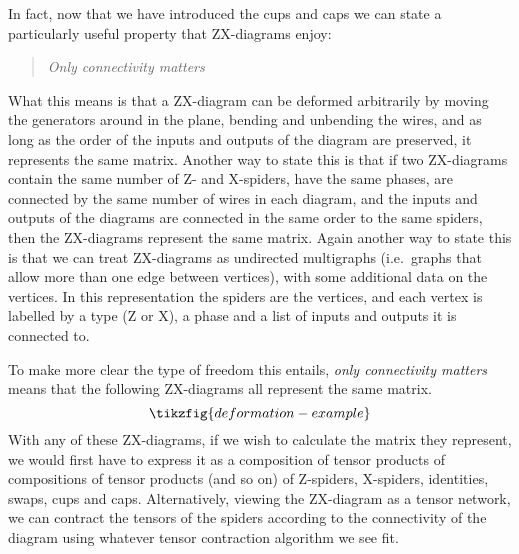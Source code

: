 \documentclass[a4paper,onecolumn,superscriptaddress,11pt,%
				unpublished,%
				allowfontchageintitle,%
				]{quantumarticle}
\begin{document}
In fact, now that we have introduced the cups and caps we can state a particularly useful property that ZX-diagrams enjoy:
\begin{quote}
	\emph{Only connectivity matters}
\end{quote}
What this means is that a ZX-diagram can be deformed arbitrarily by moving the generators around in the plane, bending and unbending the wires, and as long as the order of the inputs and outputs of the diagram are preserved, it represents the same matrix.
Another way to state this is that if two ZX-diagrams contain the same number of Z- and X-spiders, have the same phases, are connected by the same number of wires in each diagram, and the inputs and outputs of the diagrams are connected in the same order to the same spiders, then the ZX-diagrams represent the same matrix.
Again another way to state this is that we can treat ZX-diagrams as undirected multigraphs (i.e.~graphs that allow more than one edge between vertices), with some additional data on the vertices. In this representation the spiders are the vertices, and each vertex is labelled by a type (Z or X), a phase and a list of inputs and outputs it is connected to.

To make more clear the type of freedom this entails, \emph{only connectivity matters} means that the following ZX-diagrams all represent the same matrix.
\begin{equation}
\tikzfig{deformation-example}
\end{equation}
With any of these ZX-diagrams, if we wish to calculate the matrix they represent, we would first have to express it as a composition of tensor products of compositions of tensor products (and so on) of Z-spiders, X-spiders, identities, swaps, cups and caps. Alternatively, viewing the ZX-diagram as a tensor network, we can contract the tensors of the spiders according to the connectivity of the diagram using whatever tensor contraction algorithm we see fit.
\end{document}
